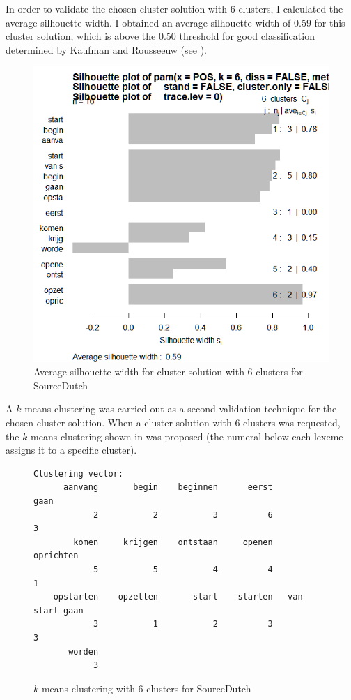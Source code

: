 In order to validate the chosen cluster solution with 6 clusters, I calculated the average silhouette width. I obtained an average silhouette width of 0.59 for this cluster solution, which is above the 0.50 threshold for good classification determined by Kaufman and Rousseeuw (see ).

\begin{figure}
\includegraphics[height=.6\textwidth]{figures/Vandevoorde2-img53.png}
\caption{\label{fig:4:53}Average silhouette width for cluster solution with 6 clusters for SourceDutch}
\end{figure}

A $k$-means clustering was carried out as a second validation technique for the chosen cluster solution. When a cluster solution with 6 clusters was requested, the $k$-means clustering shown in  was proposed (the numeral below each lexeme assigns it to a specific cluster).
  
\begin{figure}
\centering%
\begin{lstlisting}
Clustering vector:
      aanvang       begin    beginnen      eerst             gaan 
            2           2           3          6                3         
        komen     krijgen    ontstaan     openen        oprichten         
            5           5           4          4                1         
    opstarten    opzetten       start    starten   van start gaan         
            3           1           2          3                3         
       worden                                            
            3                                      
\end{lstlisting}     
\caption{\label{fig:4:54}$k$-means clustering with 6 clusters for SourceDutch}
\end{figure}

